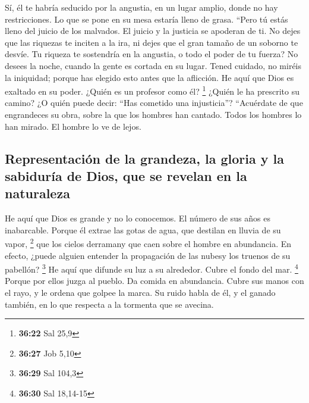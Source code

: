 \begin{paracol}{2}
 Sí, él te habría seducido por la angustia, en un lugar
amplio, donde no hay restricciones. Lo que se pone en su mesa estaría
lleno de grasa.  ``Pero tú estás lleno del juicio de los
malvados. El juicio y la justicia se apoderan de ti.  No
dejes que las riquezas te inciten a la ira, ni dejes que el gran tamaño
de un soborno te desvíe.  Tu riqueza te sostendría en la
angustia, o todo el poder de tu fuerza?  No desees la
noche, cuando la gente es cortada en su lugar.  Tened
cuidado, no miréis la iniquidad; porque has elegido esto antes que la
aflicción.  He aquí que Dios es exaltado en su poder.
¿Quién es un profesor como él? \footnote{\textbf{36:22} Sal 25,9}
 ¿Quién le ha prescrito su camino? ¿O quién puede decir:
``Has cometido una injusticia''?  ``Acuérdate de que
engrandeces su obra, sobre la que los hombres han cantado.
 Todos los hombres lo han mirado. El hombre lo ve de
lejos.

\hypertarget{representaciuxf3n-de-la-grandeza-la-gloria-y-la-sabiduruxeda-de-dios-que-se-revelan-en-la-naturaleza}{%
\subsection{Representación de la grandeza, la gloria y la sabiduría de
Dios, que se revelan en la
naturaleza}\label{representaciuxf3n-de-la-grandeza-la-gloria-y-la-sabiduruxeda-de-dios-que-se-revelan-en-la-naturaleza}}

 He aquí que Dios es grande y no lo conocemos. El número
de sus años es inabarcable.  Porque él extrae las gotas
de agua, que destilan en lluvia de su vapor, \footnote{\textbf{36:27}
  Job 5,10}  que los cielos derramany que caen sobre el
hombre en abundancia.  En efecto, ¿puede alguien entender
la propagación de las nubesy los truenos de su pabellón? \footnote{\textbf{36:29}
  Sal 104,3}  He aquí que difunde su luz a su alrededor.
Cubre el fondo del mar. \footnote{\textbf{36:30} Sal 18,14-15}
 Porque por ellos juzga al pueblo. Da comida en
abundancia.  Cubre sus manos con el rayo, y le ordena que
golpee la marca.  Su ruido habla de él, y el ganado
también, en lo que respecta a la tormenta que se avecina.

\switchcolumn
\begin{otherlanguage}{english}


\end{otherlanguage}
\end{paracol}
